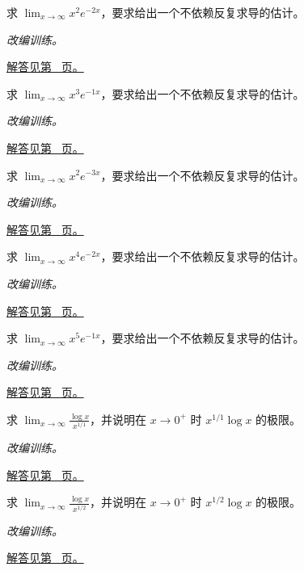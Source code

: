 \documentclass[UTF8,12pt,a4paper,fontset=fandol]{ctexart}
\begin{document}
\begin{example}[指数增长压过多项式]\label{ex:c4q8}
求 $\displaystyle\lim_{x\to\infty}x^{2}e^{-2x}$，要求给出一个不依赖反复求导的估计。
\par\textit{改编训练。}\par\hyperref[ans:c4q8]{解答见第~\pageref{ans:c4q8} 页。}
\end{example}
\begin{example}[指数增长压过多项式]\label{ex:c4q9}
求 $\displaystyle\lim_{x\to\infty}x^{3}e^{-1x}$，要求给出一个不依赖反复求导的估计。
\par\textit{改编训练。}\par\hyperref[ans:c4q9]{解答见第~\pageref{ans:c4q9} 页。}
\end{example}
\begin{example}[指数增长压过多项式]\label{ex:c4q10}
求 $\displaystyle\lim_{x\to\infty}x^{2}e^{-3x}$，要求给出一个不依赖反复求导的估计。
\par\textit{改编训练。}\par\hyperref[ans:c4q10]{解答见第~\pageref{ans:c4q10} 页。}
\end{example}
\begin{example}[指数增长压过多项式]\label{ex:c4q11}
求 $\displaystyle\lim_{x\to\infty}x^{4}e^{-2x}$，要求给出一个不依赖反复求导的估计。
\par\textit{改编训练。}\par\hyperref[ans:c4q11]{解答见第~\pageref{ans:c4q11} 页。}
\end{example}
\begin{example}[指数增长压过多项式]\label{ex:c4q12}
求 $\displaystyle\lim_{x\to\infty}x^{5}e^{-1x}$，要求给出一个不依赖反复求导的估计。
\par\textit{改编训练。}\par\hyperref[ans:c4q12]{解答见第~\pageref{ans:c4q12} 页。}
\end{example}
\begin{example}[对数增长慢于正幂]\label{ex:c4q13}
求 $\displaystyle\lim_{x\to\infty}\frac{\log x}{x^{1/1}}$，并说明在 $x\to0^+$ 时 $x^{1/1}\log x$ 的极限。
\par\textit{改编训练。}\par\hyperref[ans:c4q13]{解答见第~\pageref{ans:c4q13} 页。}
\end{example}
\begin{example}[对数增长慢于正幂]\label{ex:c4q14}
求 $\displaystyle\lim_{x\to\infty}\frac{\log x}{x^{1/2}}$，并说明在 $x\to0^+$ 时 $x^{1/2}\log x$ 的极限。
\par\textit{改编训练。}\par\hyperref[ans:c4q14]{解答见第~\pageref{ans:c4q14} 页。}
\end{example}
\end{document}
